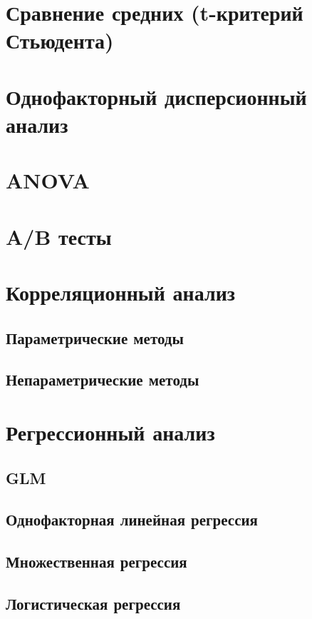 \documentclass[]{scrartcl}
\begin{document}
\section{Сравнение средних (t-критерий Стьюдента)}

\section{Однофакторный дисперсионный анализ}

\section{ANOVA}

\section{A/B тесты}

\section{Корреляционный анализ}

\subsection{Параметрические методы}

\subsection{Непараметрические методы}

\section{Регрессионный анализ}

\subsection{GLM}

\subsection{Однофакторная линейная регрессия}

\subsection{Множественная регрессия}

\subsection{Логистическая регрессия}
\end{document}
